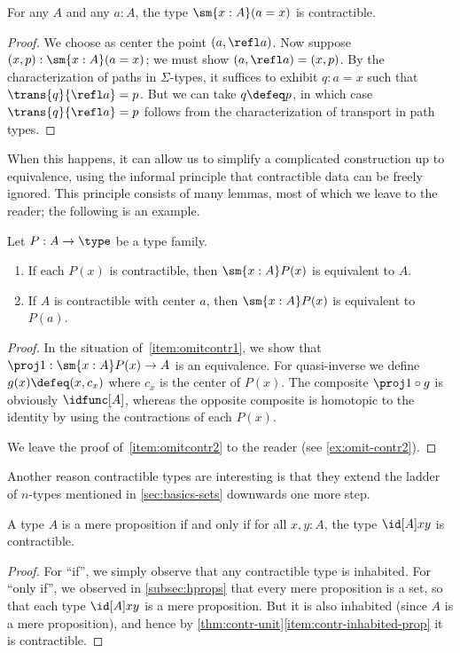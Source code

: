 \begin{lem}\label{thm:contr-paths}
  For any $A$ and any $a:A$, the type $\sm{x:A} (a=x)$ is contractible.
\end{lem}
\begin{proof}
  We choose as center the point $(a,\refl a)$.
  Now suppose $(x,p):\sm{x:A}(a=x)$; we must show $(a,\refl a) = (x,p)$.
  By the characterization of paths in $\Sigma$-types, it suffices to exhibit $q:a=x$ such that $\trans{q}{\refl a} = p$.
  But we can take $q\defeq p$, in which case $\trans{q}{\refl a} = p$ follows from the characterization of transport in path types.
\end{proof}

When this happens, it can allow us to simplify a complicated construction up to equivalence, using the informal principle that contractible data can be freely ignored.
This principle consists of many lemmas, most of which we leave to the reader; the following is an example.

\begin{lem}\label{thm:omit-contr}
  Let $P:A\to\type$ be a type family.
  \begin{enumerate}
  \item If each $P(x)$ is contractible, then $\sm{x:A} P(x)$ is equivalent to $A$.\label{item:omitcontr1}
  \item If $A$ is contractible with center $a$, then $\sm{x:A} P(x)$ is equivalent to $P(a)$.\label{item:omitcontr2}
  \end{enumerate}
\end{lem}
\begin{proof}
  In the situation of~\ref{item:omitcontr1}, we show that $\proj1:\sm{x:A} P(x) \to A$ is an equivalence.
  For quasi-inverse we define $g(x)\defeq (x,c_x)$ where $c_x$ is the center of $P(x)$.
  The composite $\proj1 \circ g$ is obviously $\idfunc[A]$, whereas the opposite composite is homotopic to the identity by using the contractions of each $P(x)$.

  We leave the proof of~\ref{item:omitcontr2} to the reader (see \cref{ex:omit-contr2}).
\end{proof}

Another reason contractible types are interesting is that they extend the ladder of $n$-types mentioned in \cref{sec:basics-sets} downwards one more step.

\begin{lem}\label{thm:prop-minusonetype}
  A type $A$ is a mere proposition if and only if for all $x,y:A$, the type $\id[A]xy$ is contractible.
\end{lem}
\begin{proof}
  For ``if'', we simply observe that any contractible type is inhabited.
  For ``only if'', we observed in \cref{subsec:hprops} that every mere proposition is a set, so that each type $\id[A]xy$ is a mere proposition.
  But it is also inhabited (since $A$ is a mere proposition), and hence by \cref{thm:contr-unit}\ref{item:contr-inhabited-prop} it is contractible.
\end{proof}

